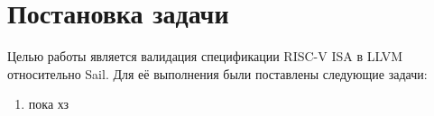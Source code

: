 
\section{Постановка задачи}
\label{sec:task}

Целью работы является валидация спецификации RISC-V ISA в
LLVM относительно Sail.
Для её выполнения были постав\-лены следующие задачи:
\begin{enumerate}
    \item пока хз
\end{enumerate}
